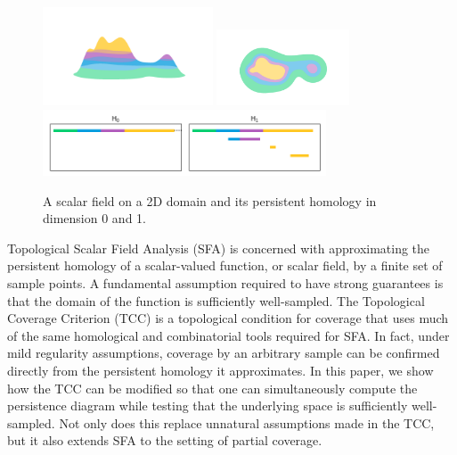 \begin{figure}[htbp]
  \centering
  \includegraphics[trim=200 200 200 200, clip, width=0.45\textwidth]{figures/surf-side.png}
  \includegraphics[trim=250 0 50 100, clip, width=0.35\textwidth]{figures/surf-top.png}
  \includegraphics[width=0.75\textwidth]{figures/scalar_barcode_true.png}
  \caption{A scalar field on a 2D domain and its persistent homology in dimension 0 and 1.}
\end{figure}

Topological Scalar Field Analysis (SFA) is concerned with approximating the persistent homology of a scalar-valued function, or scalar field, by a finite set of sample points.
A fundamental assumption required to have strong guarantees is that the domain of the function is sufficiently well-sampled.
The Topological Coverage Criterion (TCC) is a topological condition for coverage that uses much of the same homological and combinatorial tools required for SFA.
In fact, under mild regularity assumptions, coverage by an arbitrary sample can be confirmed directly from the persistent homology it approximates.
In this paper, we show how the TCC can be modified so that one can simultaneously compute the persistence diagram while testing that the underlying space is sufficiently well-sampled.
Not only does this replace unnatural assumptions made in the TCC, but it also extends SFA to the setting of partial coverage.


